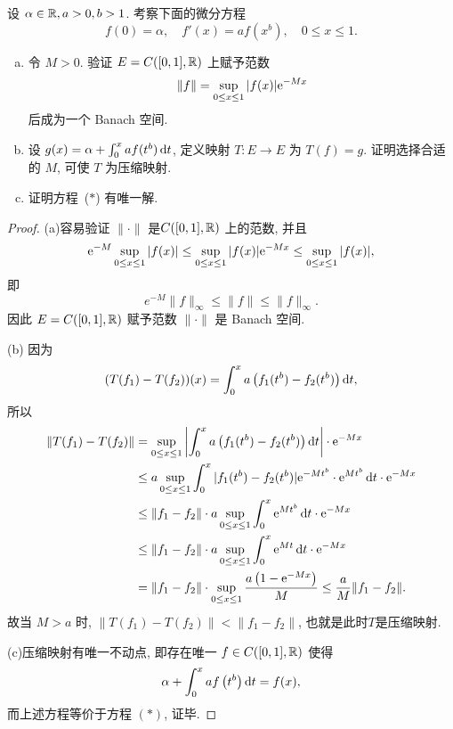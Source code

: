 \begin{exercise}
    设 $\alpha\in\mathbb{R},a>0,b>1$. 考察下面的微分方程
    \begin{equation}
    f(0)=\alpha,\quad f'(x)=af(x^b),\quad 0\leq x\leq 1.\tag{$*$}
    \end{equation}
    \begin{enumerate}[(a)]
    \item 令 $M>0$. 验证 $E=C([0,1],\mathbb{R})$ 上赋予范数
    \[\|f\|=\sup_{0\leq x\leq 1}|f(x)|\mathrm{e}^{-Mx}\]
    后成为一个 Banach 空间.
    \item 设 $g(x)=\alpha+\int_0^x af(t^b)\mathop{}\!\mathrm{d} t$, 定义映射 $T:E\to E$ 为 $T(f)=g$. 证明选择合适的 $M$, 可使 $T$ 为压缩映射.
    \item 证明方程~($*$) 有唯一解.
    \end{enumerate}
\end{exercise}

\begin{proof}
(a)容易验证 $\|\cdot\|$ 是$C([0,1],\mathbb{R})$ 上的范数, 并且
\[\mathrm{e}^{-M}\sup\limits_{0\leq x\leq1}|f(x)|\leq\sup\limits_{0\leq x\leq1}|f(x)|\mathrm{e}^{-Mx}\leq\sup\limits_{0\leq x\leq1}|f(x)|,\]
即
\[e^{-M}\|f\|_{\infty}\leq\|f\|\leq\|f\|_{\infty}.\]
因此 $E=C([0,1],\mathbb{R})$ 赋予范数 $\|\cdot\|$ 是 Banach 空间.

(b) 因为
\[(T(f_1)-T(f_2))(x)=\int_0^xa\left(f_1(t^b)-f_2(t^b)\right)\mathop{}\!\mathrm{d} t,\]
所以
\begin{align*}
    \|T(f_1)-T(f_2)\| & =\sup\limits_{0\leq x\leq 1}\left|\int_0^x a\left(f_1(t^b)-f_2(t^b)\right)\mathop{}\!\mathrm{d} t\right|\cdot \mathrm{e}^{-Mx}\\
                      & \leq a\sup\limits_{0\leq x\leq 1}\int_0^x|f_1(t^b)-f_2(t^b)|\mathrm{e}^{-Mt^b}\cdot \mathrm{e}^{Mt^b}\mathop{}\!\mathrm{d} t\cdot \mathrm{e}^{-Mx}\\
                      & \leq\|f_1-f_2\|\cdot a\sup\limits_{0\leq x\leq 1}\int_0^x \mathrm{e}^{Mt^b}\mathop{}\!\mathrm{d} t\cdot \mathrm{e}^{-Mx}\\
                      & \leq\|f_1-f_2\|\cdot a\sup\limits_{0\leq x\leq 1}\int_0^x \mathrm{e}^{Mt}\mathop{}\!\mathrm{d} t\cdot \mathrm{e}^{-Mx}\\
                      & =\|f_1-f_2\|\cdot\sup\limits_{0\leq x\leq 1}\frac{a\left(1-\mathrm{e}^{-Mx}\right)}{M}\leq\frac{a}{M}\|f_1-f_2\|.
\end{align*}
故当 $M>a$ 时, $\|T(f_1)-T(f_2)\|<\|f_1-f_2\|$, 也就是此时$T$是压缩映射.

(c)压缩映射有唯一不动点, 即存在唯一 $f\in C([0,1],\mathbb{R})$ 使得
\[\alpha+\int_0^xaf\left(t^b\right)\mathop{}\!\mathrm{d} t=f(x),\]
而上述方程等价于方程 $(*)$, 证毕.
\end{proof}


